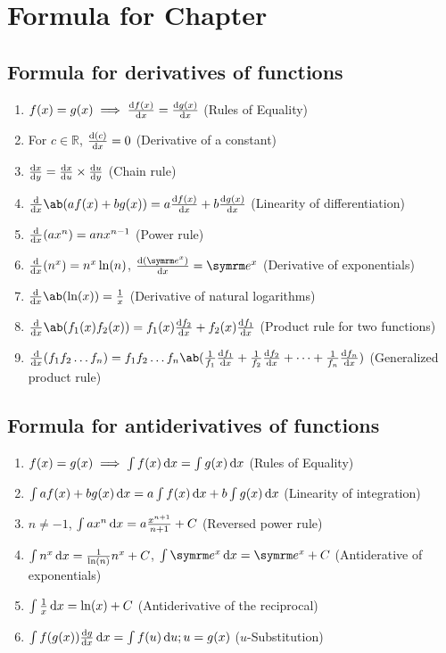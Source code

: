 \section{Formula for Chapter \thechapter}

\everymath{\displaystyle}
\subsection{Formula for derivatives of functions}

\begin{enumerate}
    \item $f(x) = g(x) \implies \odv{f(x)}{x} = \odv{g(x)}{x}$ (Rules of Equality)
    \item For $c \in \mathbb{R}$, $\odv{(c)}{x} = 0$ (Derivative of a constant)
    \item $\odv{x}{y} = \odv{x}{u} \times \odv{u}{y}$ (Chain rule)
    \item $\odv*{\ab(af(x) + bg(x))}{x} = a\odv{f(x)}{x} + b\odv{g(x)}{x}$ (Linearity of differentiation)
    \item $\odv*{(ax^n)}{x} = anx^{n - 1}$ (Power rule)
    \item $\odv*{(n^x)}{x} = n^x\ln(n)$, $\odv{(\e^x)}{x} = \e^x$ (Derivative of exponentials)
    \item $\odv*{\ab(\ln(x))}{x} = \frac{1}{x}$ (Derivative of natural logarithms)
	\item $\odv*{\ab(f_1(x)f_2(x))}{x} = f_1(x)\odv{f_2}{x} + f_2(x)\odv{f_1}{x}$ (Product rule for two functions)
	\item $\odv*{(f_1f_2\dots f_n)}{x} = f_1f_2\dots f_n\ab(\frac{1}{f_1}\odv{f_1}{x} + \frac{1}{f_2}\odv{f_2}{x} + \dots + \frac{1}{f_n}\odv{f_n}{x})$ (Generalized product rule)
\end{enumerate}

\subsection{Formula for antiderivatives of functions}

\begin{enumerate}
    \item $f(x) = g(x) \implies \int f(x)\odif{x} = \int g(x)\odif{x}$ (Rules of Equality)
    \item $\int af(x) + bg(x) \odif{x} = a\int f(x)\odif{x} + b\int g(x)\odif{x}$ (Linearity of integration)
    \item $n \neq -1$, $\int ax^n\odif{x} = a\frac{x^{n + 1}}{n + 1} + C$ (Reversed power rule)
    \item $\int n^x\odif{x} = \frac{1}{\ln(n)}n^x + C$, $\int \e^x\odif{x} = \e^x + C$ (Antiderative of exponentials)
    \item $\int \frac{1}{x}\odif{x} = \ln(x) + C$ (Antiderivative of the reciprocal)
	\item $\int f(g(x))\odv{g}{x}\odif{x} = \int f(u)\odif{u}; u = g(x)$ ($u$-Substitution)
\end{enumerate}

